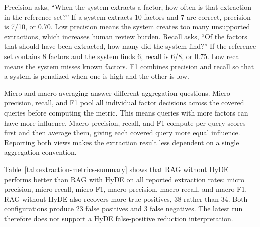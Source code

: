 Precision asks, ``When the system extracts a factor, how often is that extraction in the reference set?'' If a system extracts 10 factors and 7 are correct, precision is 7/10, or 0.70. Low precision means the system creates too many unsupported extractions, which increases human review burden. Recall asks, ``Of the factors that should have been extracted, how many did the system find?'' If the reference set contains 8 factors and the system finds 6, recall is 6/8, or 0.75. Low recall means the system misses known factors. F1 combines precision and recall so that a system is penalized when one is high and the other is low.

Micro and macro averaging answer different aggregation questions. Micro precision, recall, and F1 pool all individual factor decisions across the covered queries before computing the metric. This means queries with more factors can have more influence. Macro precision, recall, and F1 compute per-query scores first and then average them, giving each covered query more equal influence. Reporting both views makes the extraction result less dependent on a single aggregation convention.

\begin{table}[h]
\centering
\caption{Deterministic June 2026 extraction metrics for the 13 covered queries.}
\label{tab:extraction-metrics-summary}
\scriptsize
\setlength{\tabcolsep}{2pt}

\end{table}

Table~\ref{tab:extraction-metrics-summary} shows that RAG without HyDE performs better than RAG with HyDE on all reported extraction rates: micro precision, micro recall, micro F1, macro precision, macro recall, and macro F1. RAG without HyDE also recovers more true positives, 38 rather than 34. Both configurations produce 23 false positives and 3 false negatives. The latest run therefore does not support a HyDE false-positive reduction interpretation.

